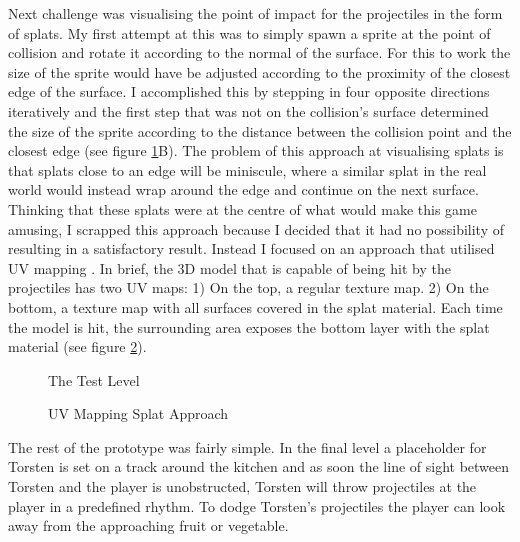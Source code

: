 Next challenge was visualising the point of impact for the projectiles in the form of splats. My first attempt at this was to simply spawn a sprite at the point of collision and rotate it according to the normal of the surface. For this to work the size of the sprite would have be adjusted according to the proximity of the closest edge of the surface. I accomplished this by stepping in four opposite directions iteratively and the first step that was not on the collision's surface determined the size of the sprite according to the distance between the collision point and the closest edge (see figure \ref{TestScene}B). The problem of this approach at visualising splats is that splats close to an edge will be miniscule, where a similar splat in the real world would instead wrap around the edge and continue on the next surface. Thinking that these splats were at the centre of what would make this game amusing, I scrapped this approach because I decided that it had no possibility of resulting in a satisfactory result. Instead I focused on an approach that utilised UV mapping \cite{mullen}. In brief, the 3D model that is capable of being hit by the projectiles has two UV maps: 1) On the top, a regular texture map. 2) On the bottom, a texture map with all surfaces covered in the splat material. Each time the model is hit, the surrounding area exposes the bottom layer with the splat material (see figure \ref{UVSplat}).
\begin{center}
  \begin{figure}[!htb]
    \noindent{}
    \caption{The Test Level}
    \label{TestScene}
  \end{figure}
\end{center}
\begin{center}
  \begin{figure}[!htb]
    \noindent{}
    \caption{UV Mapping Splat Approach}
    \label{UVSplat}
  \end{figure}
\end{center}
The rest of the prototype was fairly simple. In the final level a placeholder for Torsten is set on a track around the kitchen and as soon the line of sight between Torsten and the player is unobstructed, Torsten will throw projectiles at the player in a predefined rhythm. To dodge Torsten's projectiles the player can look away from the approaching fruit or vegetable.
